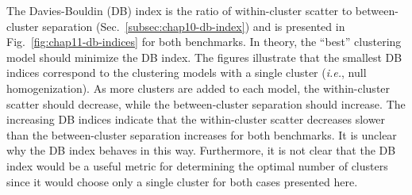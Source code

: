 The Davies-Bouldin (DB) index is the ratio of within-cluster scatter to between-cluster separation (Sec.~\ref{subsec:chap10-db-index}) and is presented in Fig.~\ref{fig:chap11-db-indices} for both benchmarks. In theory, the ``best'' clustering model should minimize the DB index. The figures illustrate that the smallest DB indices correspond to the clustering models with a single cluster (\textit{i.e.}, null homogenization). As more clusters are added to each model, the within-cluster scatter should decrease, while the between-cluster separation should increase. The increasing DB indices indicate that the within-cluster scatter decreases slower than the between-cluster separation increases for both benchmarks. It is unclear why the DB index behaves in this way. Furthermore, it is not clear that the DB index would be a useful metric for determining the optimal number of clusters since it would choose only a single cluster for both cases presented here.

